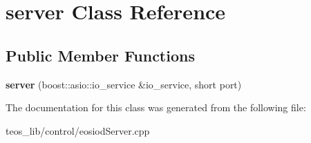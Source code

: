 \hypertarget{classserver}{}\section{server Class Reference}
\label{classserver}
\subsection*{Public Member Functions}
\begin{DoxyCompactItemize}
\item 
\mbox{\label{classserver_add3cc1b2c469ccade459882d335e369f}} 
{\bfseries server} (boost\+::asio\+::io\+\_\+service \&io\+\_\+service, short port)
\end{DoxyCompactItemize}


The documentation for this class was generated from the following file\+:\begin{DoxyCompactItemize}
\item 
teos\+\_\+lib/control/eosiod\+Server.\+cpp\end{DoxyCompactItemize}

